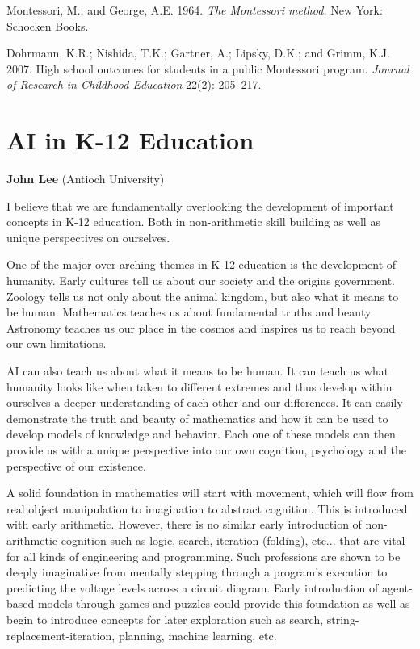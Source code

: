 \documentclass[letterpaper]{article}
\begin{document}
{\footnotesize 
{}

\noindent Montessori, M.; and George, A.E. 1964. {\em The Montessori method.} New York: Schocken Books.\vspace{0.25em}

\noindent Dohrmann, K.R.; Nishida, T.K.; Gartner, A.; Lipsky, D.K.; and Grimm, K.J. 2007. High school outcomes for students in a public Montessori program. {\em Journal of Research in Childhood Education} 22(2): 205--217.
}





\section{AI in K-12 Education}
\begin{center}
{\bf John Lee} (Antioch University)
\end{center}

I believe that we are fundamentally overlooking the development of important concepts in K-12 education.  Both in non-arithmetic skill building as well as unique perspectives on ourselves.

One of the major over-arching themes in K-12 education is the development of humanity.  Early cultures tell us about our society and the origins government.  Zoology tells us not only about the animal kingdom, but also what it means to be human.  Mathematics teaches us about fundamental truths and beauty.  Astronomy teaches us our place in the cosmos and inspires us to reach beyond our own limitations.

AI can also teach us about what it means to be human.  It can teach us what humanity looks like when taken to different extremes and thus develop within ourselves a deeper understanding of each other and our differences.  It can easily demonstrate the truth and beauty of mathematics and how it can be used to develop models of knowledge and behavior.  Each one of these models can then provide us with a unique perspective into our own cognition, psychology and the perspective of our existence.

A solid foundation in mathematics will start with movement, which will flow from real object manipulation to imagination to abstract cognition.  This is introduced with early arithmetic.  However, there is no similar early introduction of non-arithmetic cognition such as logic, search, iteration (folding), etc... that are vital for all kinds of engineering and programming.  Such professions are shown to be deeply imaginative from mentally stepping through a program's execution to predicting the voltage levels across a circuit diagram.  Early introduction of agent-based models through games and puzzles could provide this foundation as well as begin to introduce concepts for later exploration such as search, string-replacement-iteration, planning, machine learning, etc.
\end{document}
